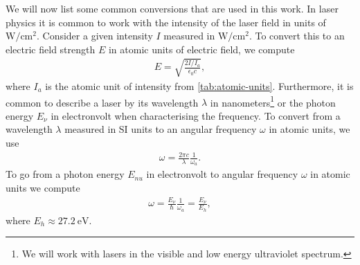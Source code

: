         We will now list some common conversions that are used in this work.
        In laser physics it is common to work with the intensity of the laser
        field in units of $\si{\watt/\cm^2}$.
        Consider a given intensity $I$ measured in $\si{\watt/\cm^2}$.
        To convert this to an electric field strength $E$ in atomic units of
        electric field, we compute
        \begin{align}
            E = \sqrt{\frac{2 I / I_a}{\epsilon_0 c}},
            \label{eq:intnsity-to-au-electric-field}
        \end{align}
        where $I_a$ is the atomic unit of intensity from
        \autoref{tab:atomic-units}.
        Furthermore, it is common to describe a laser by its wavelength
        $\lambda$ in nanometers\footnote{%
            We will work with lasers in the visible and low energy ultraviolet
            spectrum.
        } or the photon energy $E_{\nu}$ in electronvolt when characterising the
        frequency.
        To convert from a wavelength $\lambda$ measured in SI units to an
        angular frequency $\omega$ in atomic units, we use
        \begin{align}
            \omega = \frac{2\pi c}{\lambda}\frac{1}{\omega_a}.
        \end{align}
        To go from a photon energy $E_{nu}$ in electronvolt to angular frequency
        $\omega$ in atomic units we compute
        \begin{align}
            \omega = \frac{E_{\nu}}{\hslash}\frac{1}{\omega_a}
            = \frac{E_{\nu}}{E_h},
        \end{align}
        where $E_h \approx \SI{27.2}{\electronvolt}$.

\clearpage
